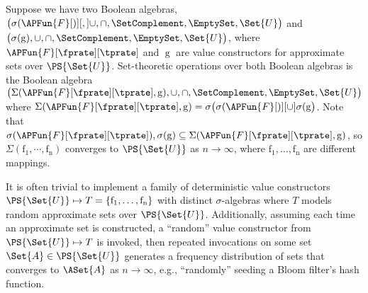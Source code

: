 \documentclass[ ../main.tex]{subfiles}
\newcommand{\ctor}[2]{\APFun{F}[#1][#2]}
\begin{document}
Suppose we have two Boolean algebras,
$\left(
    \sigma(\ctor), \cup, \cap, \SetComplement, \EmptySet,\Set{U}
\right)$ and 
$\left(
    \sigma(\operatorname{g}), \cup, \cap, \SetComplement, \EmptySet,\Set{U}
\right)$,
where $\ctor{\fprate}{\tprate}$ and $\operatorname{g}$ are value constructors for approximate sets over $\PS{\Set{U}}$. Set-theoretic operations over both Boolean algebras is the Boolean algebra
$\left(
    \Sigma(\ctor{\fprate}{\tprate},\operatorname{g}), \cup, \cap, \SetComplement, \EmptySet,\Set{U}
\right)$
where $\Sigma(\ctor{\fprate}{\tprate},\operatorname{g}) = \sigma\!\left(\sigma(\ctor) \cup \sigma(\operatorname{g}\right)$.
Note that $\sigma(\ctor{\fprate}{\tprate}), \sigma(\operatorname{g}) 
    \subseteq \Sigma(\ctor{\fprate}{\tprate},\operatorname{g})$,
so $\Sigma(\operatorname{f_1}, \cdots, \operatorname{f_n})$ converges to $\PS{\Set{U}}$ as $n \to \infty$,
where $\operatorname{f_1},\ldots,\operatorname{f_n}$ are different mappings.

\begin{remark}
It is often trivial to implement a family of deterministic value constructors $\PS{\Set{U}} \mapsto T = \{\operatorname{f_1},\ldots,\operatorname{f_n}\}$ with distinct $\sigma$-algebras where $T$ models random approximate sets over $\PS{\Set{U}}$.
Additionally, assuming each time an approximate set is constructed, a ``random'' value constructor from $\PS{\Set{U}} \mapsto T$ is invoked, then repeated invocations on some set $\Set{A} \in \PS{\Set{U}}$ generates a frequency distribution of sets that converges to $\ASet{A}$ as $n \to \infty$, e.g., ``randomly'' seeding a Bloom filter's hash function.
\end{remark}

\end{document}
